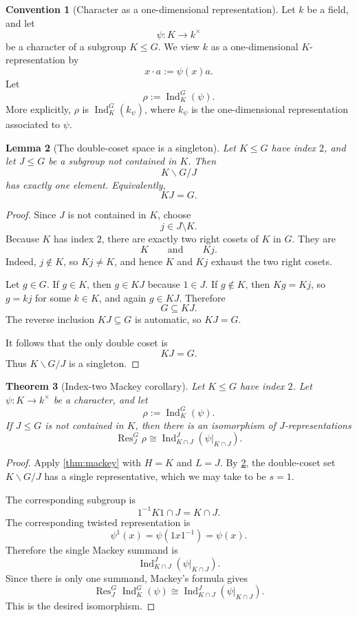 \documentclass[11pt]{article}
\newtheorem{theorem}{Theorem}[section]
\newtheorem{lemma}[theorem]{Lemma}
\theoremstyle{definition}
\newtheorem{convention}[theorem]{Convention}
\newcommand{\Ind}{\operatorname{Ind}}
\newcommand{\Res}{\operatorname{Res}}
\begin{document}
\begin{convention}[Character as a one-dimensional representation]
Let $k$ be a field, and let
\[
  \psi : K \to k^\times
\]
be a character of a subgroup $K\leq G$. We view $k$ as a one-dimensional $K$-representation by
\[
  x\cdot a := \psi(x)a.
\]
Let
\[
  \rho := \Ind_K^G(\psi).
\]
More explicitly, $\rho$ is $\Ind_K^G(k_\psi)$, where $k_\psi$ is the one-dimensional representation associated to $\psi$.
\end{convention}

\begin{lemma}[The double-coset space is a singleton]\label{lem:index-two-singleton}
Let $K\leq G$ have index $2$, and let $J\leq G$ be a subgroup not contained in $K$. Then
\[
  K\backslash G/J
\]
has exactly one element. Equivalently,
\[
  KJ=G.
\]
\end{lemma}

\begin{proof}
Since $J$ is not contained in $K$, choose
\[
  j\in J\setminus K.
\]
Because $K$ has index $2$, there are exactly two right cosets of $K$ in $G$. They are
\[
  K
  \qquad\text{and}\qquad
  Kj.
\]
Indeed, $j\notin K$, so $Kj\neq K$, and hence $K$ and $Kj$ exhaust the two right cosets.

Let $g\in G$. If $g\in K$, then $g\in KJ$ because $1\in J$. If $g\notin K$, then $Kg=Kj$, so $g=kj$ for some $k\in K$, and again $g\in KJ$. Therefore
\[
  G\subseteq KJ.
\]
The reverse inclusion $KJ\subseteq G$ is automatic, so $KJ=G$.

It follows that the only double coset is
\[
  KJ=G.
\]
Thus $K\backslash G/J$ is a singleton.
\end{proof}

\begin{theorem}[Index-two Mackey corollary]\label{thm:index-two-corollary}
Let $K\leq G$ have index $2$. Let $\psi:K\to k^\times$ be a character, and let
\[
  \rho:=\Ind_K^G(\psi).
\]
If $J\leq G$ is not contained in $K$, then there is an isomorphism of $J$-representations
\[
  \Res^G_J \rho
  \cong
  \Ind_{K\cap J}^{J}(\psi|_{K\cap J}).
\]
\end{theorem}

\begin{proof}
Apply \cref{thm:mackey} with $H=K$ and $L=J$. By \cref{lem:index-two-singleton}, the double-coset set $K\backslash G/J$ has a single representative, which we may take to be $s=1$.

The corresponding subgroup is
\[
  1^{-1}K1\cap J=K\cap J.
\]
The corresponding twisted representation is
\[
  \psi^1(x)=\psi(1x1^{-1})=\psi(x).
\]
Therefore the single Mackey summand is
\[
  \Ind_{K\cap J}^{J}(\psi|_{K\cap J}).
\]
Since there is only one summand, Mackey's formula gives
\[
  \Res^G_J\Ind_K^G(\psi)
  \cong
  \Ind_{K\cap J}^{J}(\psi|_{K\cap J}).
\]
This is the desired isomorphism.
\end{proof}
\end{document}
